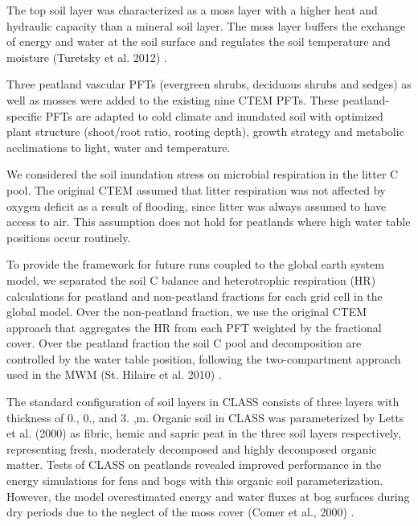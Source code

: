 \begin{DoxyEnumerate}
\item The top soil layer was characterized as a moss layer with a higher heat and hydraulic capacity than a mineral soil layer. The moss layer buffers the exchange of energy and water at the soil surface and regulates the soil temperature and moisture (Turetsky et al. 2012) \cite{Turetsky2012-qh}.
\item Three peatland vascular P\+F\+Ts (evergreen shrubs, deciduous shrubs and sedges) as well as mosses were added to the existing nine C\+T\+E\+M P\+F\+Ts. These peatland-\/specific P\+F\+Ts are adapted to cold climate and inundated soil with optimized plant structure (shoot/root ratio, rooting depth), growth strategy and metabolic acclimations to light, water and temperature.
\item We considered the soil inundation stress on microbial respiration in the litter C pool. The original C\+T\+E\+M assumed that litter respiration was not affected by oxygen deficit as a result of flooding, since litter was always assumed to have access to air. This assumption does not hold for peatlands where high water table positions occur routinely.
\item To provide the framework for future runs coupled to the global earth system model, we separated the soil C balance and heterotrophic respiration (H\+R) calculations for peatland and non-\/peatland fractions for each grid cell in the global model. Over the non-\/peatland fraction, we use the original C\+T\+E\+M approach that aggregates the H\+R from each P\+F\+T weighted by the fractional cover. Over the peatland fraction the soil C pool and decomposition are controlled by the water table position, following the two-\/compartment approach used in the M\+W\+M (St. Hilaire et al. 2010) \cite{St-Hilaire2010-5e9}.
\end{DoxyEnumerate}

The standard configuration of soil layers in C\+L\+A\+S\+S consists of three layers with thickness of 0., 0., and 3. ,m. Organic soil in C\+L\+A\+S\+S was parameterized by Letts et al. (2000) \cite{Letts2000-pg} as fibric, hemic and sapric peat in the three soil layers respectively, representing fresh, moderately decomposed and highly decomposed organic matter. Tests of C\+L\+A\+S\+S on peatlands revealed improved performance in the energy simulations for fens and bogs with this organic soil parameterization. However, the model overestimated energy and water fluxes at bog surfaces during dry periods due to the neglect of the moss cover (Comer et al., 2000) \cite{Comer2000-mz}.

